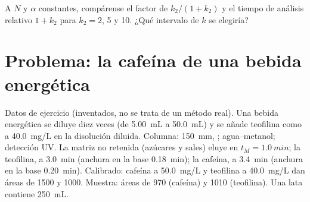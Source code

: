 \begin{exercise}[$\star\star\star$]\label{exo:b2:chromatography:12}
A $N$ y $\alpha$ constantes, compárense el factor de  $k_2/(1+k_2)$ y el tiempo de análisis relativo
$1 + k_2$ para $k_2 = 2$, 5 y 10. ¿Qué intervalo de $k$ se elegiría?
\end{exercise}

\section{Problema: la cafeína de una bebida energética}

\begin{problem}
\label{pb:b2:chromatography:1}
Datos de ejercicio (inventados, no se trata de un método real). Una bebida energética se diluye diez veces (de \qty{5.00}{mL} a
\qty{50.0}{mL}) y se añade teofilina como  a \qty{40.0}{mg/L} en la disolución
diluida. Columna: \qty{150}{mm}, ;  agua--metanol; detección UV. La
matriz no retenida (azúcares y sales) eluye en $t_M = \qty{1.0}{min}$; la teofilina, a
\qty{3.0}{min} (anchura en la base \qty{0.18}{min}); la cafeína, a \qty{3.4}{min} (anchura en la base \qty{0.20}{min}).
Calibrado: cafeína a \qty{50.0}{mg/L} y teofilina a \qty{40.0}{mg/L} dan áreas de 1500 y 1000.
Muestra: áreas de 970 (cafeína) y 1010 (teofilina). Una lata contiene \qty{250}{mL}.

\begin{center}
\end{center}


\end{problem}
